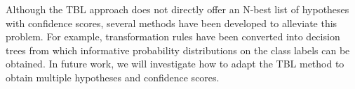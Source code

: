 \documentclass{article}
\begin{document}
Although the TBL approach does not directly offer an N-best list of hypotheses with confidence scores, several methods have been developed to alleviate this problem. For example, transformation rules have been converted into decision trees \cite{florian00} from which informative probability distributions on the class labels can be obtained. In future work, we will investigate how to adapt the TBL method to obtain multiple hypotheses and confidence scores.


\eightpt


\end{document}
